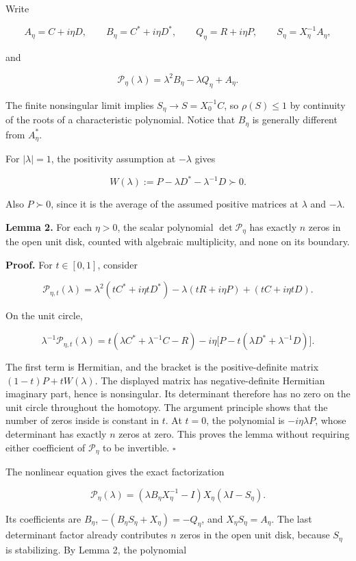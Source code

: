 \documentclass[10pt,a4paper]{article}
\begin{document}
Write

\[
A_\eta=C+i\eta D,\qquad B_\eta=C^*+i\eta D^*,\qquad
Q_\eta=R+i\eta P,\qquad S_\eta=X_\eta^{-1}A_\eta,
\]

and

\[
\mathcal P_\eta(\lambda)=\lambda^2B_\eta-\lambda Q_\eta+A_\eta.
\]

The finite nonsingular limit implies \(S_\eta\to S=X_0^{-1}C\), so
\(\rho(S)\leq1\) by continuity of the roots of a characteristic
polynomial. Notice that \(B_\eta\) is generally different from
\(A_\eta^*\).

For \(|\lambda|=1\), the positivity assumption at \(-\lambda\) gives

\[
W(\lambda):=P-\lambda D^*-\lambda^{-1}D\succ0. \tag{1}
\]

Also \(P\succ0\), since it is the average of the assumed positive
matrices at \(\lambda\) and \(-\lambda\).

\textbf{Lemma 2.} For each \(\eta>0\), the scalar polynomial
\(\det\mathcal P_\eta\) has exactly \(n\) zeros in the open unit disk,
counted with algebraic multiplicity, and none on its boundary.

\textbf{Proof.} For \(t\in[0,1]\), consider

\[
\mathcal P_{\eta,t}(\lambda)
=\lambda^2(tC^*+i\eta tD^*)
 -\lambda(tR+i\eta P)+(tC+i\eta tD).
\]

On the unit circle,

\[
\lambda^{-1}\mathcal P_{\eta,t}(\lambda)
=t(\lambda C^*+\lambda^{-1}C-R)
 -i\eta\bigl[P-t(\lambda D^*+\lambda^{-1}D)\bigr].
\]

The first term is Hermitian, and the bracket is the positive-definite
matrix \((1-t)P+tW(\lambda)\). The displayed matrix has
negative-definite Hermitian imaginary part, hence is nonsingular. Its
determinant therefore has no zero on the unit circle throughout the
homotopy. The argument principle shows that the number of zeros inside
is constant in \(t\). At \(t=0\), the polynomial is \(-i\eta\lambda P\),
whose determinant has exactly \(n\) zeros at zero. This proves the lemma
without requiring either coefficient of \(\mathcal P_\eta\) to be
invertible. \(\square\)

The nonlinear equation gives the exact factorization

\[
\mathcal P_\eta(\lambda)
=(\lambda B_\eta X_\eta^{-1}-I)X_\eta(\lambda I-S_\eta). \tag{2}
\]

Its coefficients are \(B_\eta\), \(-(B_\eta S_\eta+X_\eta)=-Q_\eta\),
and \(X_\eta S_\eta=A_\eta\). The last determinant factor already
contributes \(n\) zeros in the open unit disk, because \(S_\eta\) is
stabilizing. By Lemma 2, the polynomial
\end{document}
